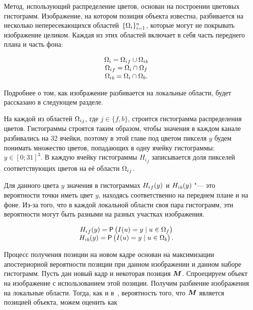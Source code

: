 Метод, использующий распределение цветов, основан на построении цветовых
гистограмм.
Изображение, на котором позиция объекта известна, разбивается на несколько
непересекающихся областей~$\{\Omega_i\}_{i = 1}^n$, которые могут не покрывать 
изображение целиком.
Каждая из этих областей включает в себя часть переднего плана и часть фона:

\begin{equation}
\label{eqn:histo_partitioning}
\begin{array}{c}
\Omega_i = {\Omega_i}_f \cup {\Omega_i}_b \\
{\Omega_i}_f = \Omega_i \cap \Omega_f \\
{\Omega_i}_b = \Omega_i \cap \Omega_b
\text{.}
\end{array}
\end{equation}

Подробнее о том, как изображение разбивается на локальные области, будет
рассказано в следующем разделе.

На каждой из областей ${\Omega_i}_j$, где $j \in \{ f, b\}$, строится
гистограмма распределения цветов.
Гистограммы строятся таким образом, чтобы значения в каждом канале разбивались
на 32 ячейки, поэтому в этой главе под цветом пикселя $y$ будем понимать
множество цветов, попадающих в одну ячейку гистограммы: $y \in [0; 31]^3$.
В каждую ячейку гистограммы ${H_i}_j$ записывается доля пикселей
соответствующих
цветов на её области ${\Omega_i}_j$.

Для данного цвета $y$ значения в гистограммах ${H_i}_f(y)$ и
${H_i}_b(y)$ "--- это вероятности точки иметь цвет $y$, находясь
соответственно на переднем плане и на фоне.
Из-за того, что в каждой локальной области своя пара гистограмм, эти
вероятности могут быть разными на разных участках изображения.

\begin{equation}
\label{eqn:H_f_Y}
\begin{array}{c}
{\ensuremath{H_i}}_f(y) = \mathsf{P} \left( I(\mathnormal{u}) = y \mid \mathnormal{u} \in \Omega_f \right) \\
{H_i}_b(y) = \mathsf{P} \left( I(\mathnormal{u}) = y \mid \mathnormal{u} \in \Omega_b \right)
\text{.}
\end{array}
\end{equation}

Процесс получения позиции на новом кадре основан на максимизации апостериорной
вероятности позиции при данном изображении и данном наборе гистограмм.
Пусть дан новый кадр и некоторая позиция $\bm{M}$.
Спроецируем объект на изображение с использованием этой позиции.
Получим разбиение изображения на локальные области.
Тогда, как и в~\cite{Hexner2016}, вероятность того, что $\bm{M}$ является
позицией
объекта, можем оценить как

